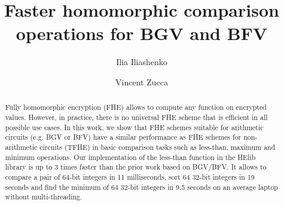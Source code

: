 \documentclass[USenglish,oneside,twocolumn]{article}
\theoremstyle{remark}
\begin{document}
 

  \author*[1]{Ilia Iliashenko}

  \author[2]{Vincent Zucca}





  \title{Faster homomorphic comparison operations for BGV and BFV}



  \begin{abstract} 
  {Fully homomorphic encryption (FHE) allows to compute any function on encrypted values.
  However, in practice, there is no universal FHE scheme that is efficient in all possible use cases.
  In this work, we show that FHE schemes suitable for arithmetic circuits (e.g. BGV or BFV) have a similar performance as FHE schemes for non-arithmetic circuits (TFHE) in basic comparison tasks such as less-than, maximum and minimum operations.
  Our implementation of the less-than function in the HElib library is up to 3 times faster than the prior work based on BGV/BFV.
  It allows to compare a pair of 64-bit integers in 11 milliseconds, sort 64 32-bit integers in 19 seconds and find the minimum of 64 32-bit integers in 9.5 seconds on an average laptop without multi-threading.}     
  \end{abstract}


 

\maketitle
\end{document}

